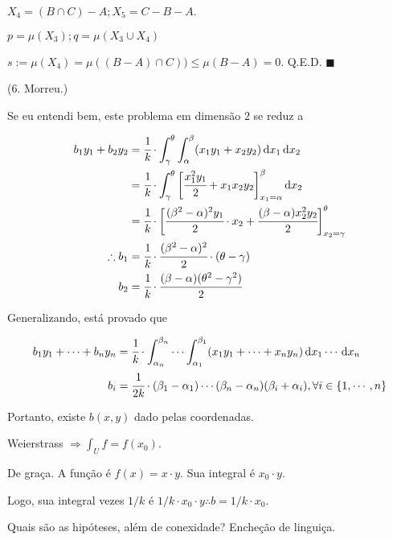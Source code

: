 \documentclass[12pt]{article}
\begin{document}
$X_4 = (B \cap C) - A ; X_5 = C - B - A$.

$p = \mu(X_3) ; q = \mu(X_3 \cup X_4)$

$s := \mu(X_4) = \mu((B - A) \cap C)) \le \mu(B - A) = 0$. Q.E.D.$\,\,\blacksquare$

\vspace{100mm}

(6. Morreu.)

Se eu entendi bem, este problema em dimens\~ao $2$ se reduz a

\begin{align}
  b_1 y_1 + b_2 y_2 &= \cfrac{1}{k}\cdot \int_{\gamma}^{\theta} \int_{\alpha}^{\beta} (x_1 y_1 + x_2 y_2) \,\mathrm{d}x_1 \,\mathrm{d}x_2 \\
  &= \cfrac{1}{k}\cdot \int_{\gamma}^{\theta} \bigg[\cfrac{x_1^2 y_1}{2} + x_1 x_2 y_2 \bigg]_{x_1 = \alpha}^{\beta} \,\mathrm{d}x_2 \\
  &= \cfrac{1}{k}\cdot \bigg[\cfrac{(\beta^2 - \alpha)^2 y_1}{2}\cdot x_2 + \cfrac{(\beta - \alpha) x_2^2 y_2}{2} \bigg]_{x_2 = \gamma}^{\theta} \\
  \therefore b_1 &= \cfrac{1}{k}\cdot \cfrac{(\beta^2 - \alpha)^2}{2}\cdot (\theta - \gamma) \\
  b_2 &= \cfrac{1}{k}\cdot \cfrac{(\beta - \alpha) (\theta^2 - \gamma^2)}{2}
\end{align}

Generalizando, est\'a provado que

\begin{align}
  b_1 y_1 + \cdots + b_n y_n &= \cfrac{1}{k}\cdot \int_{\alpha_n}^{\beta_n} \cdots \int_{\alpha_1}^{\beta_1} (x_1 y_1 + \cdots + x_n y_n) \,\mathrm{d}x_1 \cdots \,\mathrm{d}x_n \\
  b_i &= \cfrac{1}{2k}\cdot (\beta_1 - \alpha_1) \cdots (\beta_n - \alpha_n) (\beta_i + \alpha_i), \forall i \in \{1, \cdots, n\}
\end{align}

Portanto, existe $b(x,y)$ dado pelas coordenadas.

\vspace{3mm}

Weierstrass $\Rightarrow \int_U f = f(x_0)$.

De gra\c{c}a. A fun\c{c}\~ao \'e $f(x) = x \cdot y$. Sua integral \'e $x_0 \cdot y$.

Logo, sua integral vezes $1/k$ \'e $1/k \cdot x_0 \cdot y \therefore b = 1/k \cdot x_0$.

Quais s\~ao as hip\'oteses, al\'em de conexidade? Enche\c{c}\~ao de lingui\c{c}a.
\end{document}
